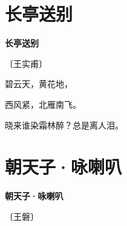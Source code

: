 \documentclass[12pt,UTF-8,openany,fontset=none]{ctexbook}
\begin{document}
\section{长亭送别}


\begin{center}
    {\bfseries 长亭送别}

    \vspace{18pt}

    \begin{large}\xuwen
        〔王实甫〕
    \end{large}

\end{center}

    \vspace{18pt}  %

\begin{center}
    \begin{Large}

        碧云天，黄花地，

        西风紧，北雁南飞。

        晓来谁染霜林醉？总是离人泪。

    \end{Large}

\end{center}

\vspace{8pt}
\clearpage

\section{朝天子·咏喇叭}


\begin{center}
    {\bfseries 朝天子·咏喇叭}

    \vspace{18pt}

    \begin{large}\xuwen
        〔王磐〕
    \end{large}

\end{center}

    \vspace{18pt}  %
\end{document}
